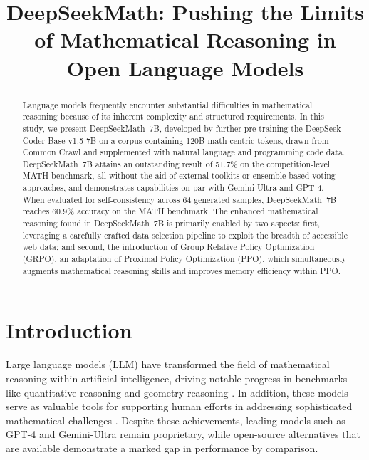\title{DeepSeekMath: Pushing the Limits of Mathematical Reasoning in Open Language Models}

\begin{abstract}
Language models frequently encounter substantial difficulties in mathematical reasoning because of its inherent complexity and structured requirements. In this study, we present DeepSeekMath~7B, developed by further pre-training the DeepSeek-Coder-Base-v1.5 7B on a corpus containing 120B math-centric tokens, drawn from Common Crawl and supplemented with natural language and programming code data. DeepSeekMath~7B attains an outstanding result of 51.7\% on the competition-level MATH benchmark, all without the aid of external toolkits or ensemble-based voting approaches, and demonstrates capabilities on par with Gemini-Ultra and GPT-4. When evaluated for self-consistency across 64 generated samples, DeepSeekMath~7B reaches 60.9\% accuracy on the MATH benchmark. The enhanced mathematical reasoning found in DeepSeekMath~7B is primarily enabled by two aspects: first, leveraging a carefully crafted data selection pipeline to exploit the breadth of accessible web data; and second, the introduction of Group Relative Policy Optimization (GRPO), an adaptation of Proximal Policy Optimization (PPO), which simultaneously augments mathematical reasoning skills and improves memory efficiency within PPO.
\end{abstract}

\section{Introduction}

Large language models (LLM) have transformed the field of mathematical reasoning within artificial intelligence, driving notable progress in benchmarks like quantitative reasoning \citep{MATH} and geometry reasoning \citep{trinh2024solving}. In addition, these models serve as valuable tools for supporting human efforts in addressing sophisticated mathematical challenges \citep{tao}. Despite these achievements, leading models such as GPT-4 \citep{gpt4} and Gemini-Ultra \citep{gemini} remain proprietary, while open-source alternatives that are available demonstrate a marked gap in performance by comparison.

